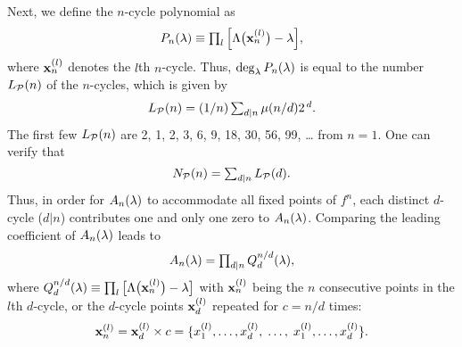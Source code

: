 \documentclass{ws-ijbc}
\begin{document}


Next, we define the $n$-cycle polynomial as
\begin{equation}
  P_n(\lambda) \equiv \textstyle\prod_l \Big[
    \Lambda\big(\mathbf{x}_{n}^{(l)}\big) - \lambda
  \Big],
\notag
\end{equation}
where $\mathbf{x}_{n}^{(l)}$ denotes the $l$th $n$-cycle.
%
Thus, $\deg_\lambda P_n(\lambda)$
  is equal to the number $L_\mathcal P(n)$ of the $n$-cycles,
  which is given by
  \cite{hao, hao2, lutzky}
\begin{equation}
  L_\mathcal P(n) = (1/n)\textstyle\sum_{d | n} \mu(n/d) 2^{\,d}.
\label{eq:lyndon}
\end{equation}
%
%
%
The first few $L_\mathcal P(n)$ are
2, 1, 2, 3, 6, 9, 18, 30, 56, 99, \dots %
from $n = 1$.
%
%
One can verify that
\begin{equation}
  N_\mathcal P(n) = \textstyle\sum_{d|n} L_\mathcal P(d).
\notag
\end{equation}
%
Thus, in order for $A_n(\lambda)$ to accommodate all fixed points of $f^n$,
  each distinct $d$-cycle ($d|n$)
  contributes one and only one zero to $A_n(\lambda)$.
%
%
Comparing the leading coefficient of $A_n(\lambda)$ leads to
  \begin{equation}
    A_n(\lambda) = \textstyle\prod_{d|n} Q_d^{n/d}(\lambda),
    \label{eq:prod}
  \end{equation}
where $Q_d^{n/d}(\lambda) \equiv \prod_l
  \big[\Lambda\big(\mathbf{x}_{n}^{(l)}\big) - \lambda\big]$
  with $\mathbf{x}_{n}^{(l)}$ being the $n$ consecutive points
  in the $l$th $d$-cycle,
%
  or the $d$-cycle points $\mathbf{x}_{d}^{(l)}$
  repeated for $c = n/d$ times:
\begin{equation}
  \mathbf{x}_{n}^{(l)}
  =
  \mathbf{x}_{d}^{(l)} \times c
  =
  \{
    x_1^{(l)}, \ldots, x_d^{(l)},
    \; \ldots, \;
    x_1^{(l)}, \ldots, x_d^{(l)}
  \}.
\notag
\end{equation}
\end{document}
